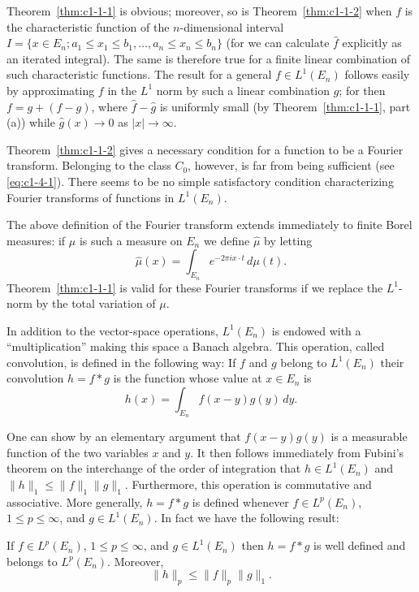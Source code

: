 Theorem~\ref{thm:c1-1-1} is obvious; moreover, so is
Theorem~\ref{thm:c1-1-2} when $f$ is the characteristic function of the
$n$-dimensional interval
$I = \{x \in E_{n}; a_{1} \leq x_{1} \leq b_{1}, \ldots, a_{n} \leq x_{n} \leq b_{n}\}$
(for we can calculate $\hat{f}$ explicitly as an iterated integral). The same is
therefore true for a finite linear combination of such characteristic functions.
The result for a general $f \in L^{1}(E_{n})$ follows easily by approximating
$f$ in the $L^{1}$ norm by such a linear combination $g$; for then
$f = g + (f - g)$, where $\hat{f} - \hat{g}$ is uniformly small (by
Theorem~\ref{thm:c1-1-1}, part (a)) while $\hat{g}(x) \to 0$ as
$|x| \to \infty$.

Theorem~\ref{thm:c1-1-2} gives a necessary condition for a function to be a
Fourier transform. Belonging to the class $C_{0}$, however, is far from being
sufficient (see \eqref{eq:c1-4-1}). There seems to be no simple satisfactory
condition characterizing Fourier transforms of functions in $L^{1}(E_{n})$.

The above definition of the Fourier transform extends immediately to finite
Borel measures: if $\mu$ is such a measure on $E_{n}$ we define $\hat{\mu}$ by
letting
\[
\hat{\mu}(x)=\int_{E_{n}}e^{-2\pi i x\cdot t}\,d\mu(t).
\]
Theorem~\ref{thm:c1-1-1} is valid for these Fourier transforms if we replace the
$L^{1}$-norm by the total variation of $\mu$.

In addition to the vector-space operations, $L^{1}(E_{n})$ is endowed with a
``multiplication'' making this space a Banach algebra. This operation, called
convolution, is defined in the following way: If $f$ and $g$ belong to
$L^{1}(E_{n})$ their convolution $h = f * g$ is the function whose value at
$x \in E_{n}$ is
\[
h(x)=\int_{E_{n}}f(x-y)g(y)\,dy.
\]

One can show by an elementary argument that $f(x - y)g(y)$ is a measurable
function of the two variables $x$ and $y$. It then follows immediately from
Fubini's theorem on the interchange of the order of integration that
$h \in L^{1}(E_{n})$ and $\|h\|_{1} \leq \|f\|_{1}\|g\|_{1}$. Furthermore, this
operation is commutative and associative. More generally, $h = f * g$ is
defined whenever $f \in L^{p}(E_{n})$, $1 \leq p \leq \infty$, and
$g \in L^{1}(E_{n})$. In fact we have the following result:

\begin{theorem}\label{thm:c1-1-3}
If $f \in L^{p}(E_{n})$, $1 \leq p \leq \infty$, and $g \in L^{1}(E_{n})$ then
$h = f * g$ is well defined and belongs to $L^{p}(E_{n})$. Moreover,
\[
\|h\|_{p}\leq\|f\|_{p}\|g\|_{1}.
\]
\end{theorem}

